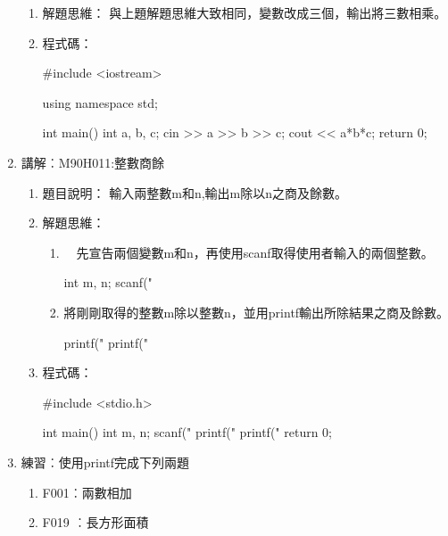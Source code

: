 \begin{enumerate}
\begin{enumerate}
			\item 解題思維：
			\subitem 與上題解題思維大致相同，變數改成三個，輸出將三數相乘。
			
			\item 程式碼：
			\begin{cppcode}
				#include <iostream>
				
				using namespace std;
				
				int main()
				{
					int a, b, c;
					cin >> a >> b >> c;
					cout << a*b*c;
					return 0;	
				}
			\end{cppcode}
		\end{enumerate}
		
	\item 講解︰M90H011:整數商餘%
		\begin{enumerate}
			\item 題目說明：
			\subitem 
			輸入兩整數m和n,輸出m除以n之商及餘數。
			\item 解題思維：
			\begin{enumerate}
			\item 　先宣告兩個變數m和n，再使用scanf取得使用者輸入的兩個整數。
			\begin{inside}
			int m, n;
			scanf("%
			\end{inside}
			\item  將剛剛取得的整數m除以整數n，並用printf輸出所除結果之商及餘數。
			\begin{inside}
			printf("\n%
			printf("\n%
			\end{inside}
			\end{enumerate}
			
			\item 程式碼：
			\begin{cppcode}
				#include <stdio.h>
				
				int main()
				{
					int m, n;
					scanf("%
					printf("\n%
					printf("\n%
					return 0;
				}
			\end{cppcode}
		\end{enumerate}
	
	\item 練習︰使用printf完成下列兩題
	\begin{enumerate}
		\item F001︰兩數相加
		\item F019 ︰長方形面積
	\end{enumerate}
\end{enumerate}

